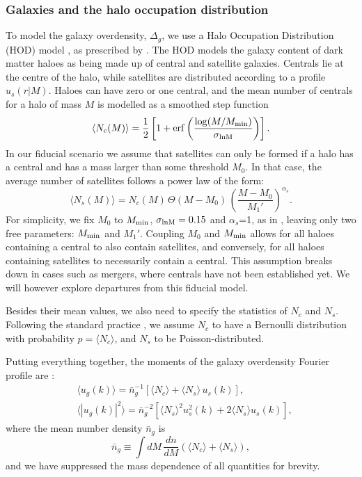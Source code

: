 \documentclass[useAMS,usenatbib]{mn2e}
\begin{document}
    \subsubsection{Galaxies and the halo occupation distribution}\label{sssec:theory.hm.hod}
      To model the galaxy overdensity, $\Delta_g$, we use a Halo Occupation Distribution (HOD) model \citep{2002ApJ...575..587B,2005ApJ...633..791Z,2013MNRAS.430..725V}, as prescribed by \cite{2011ApJ...736...59Z}. The HOD models the galaxy content of dark matter haloes as being made up of central and satellite galaxies. Centrals lie at the centre of the halo, while satellites are distributed according to a profile $u_s(r|M)$. Haloes can have zero or one central, and the mean number of centrals for a halo of mass $M$ is modelled as a smoothed step function
      \begin{equation}
        \langle N_c(M)\rangle=\frac{1}{2}\left[1+{\rm erf}\left(\frac{\log(M/M_{\rm min})}{\sigma_{\rm lnM}}\right)\right].
      \end{equation}
      In our fiducial scenario we assume that satellites can only be formed if a halo has a central and has a mass larger than some threshold $M_0$. In that case, the average number of satellites follows a power law of the form:
      \begin{equation}\label{eq:hod1}
        \langle N_s(M)\rangle=N_c(M)\,\Theta(M-M_0)\,\left(\frac{M-M_0}{M_1'}\right)^{\alpha_s}.
      \end{equation}
      For simplicity, we fix $M_0$ to $M_{\rm min}$, $\sigma_{\rm lnM}=0.15$ and $\alpha_s$=1, as in \cite{2018MNRAS.473.4318A}, leaving only two free parameters: $M_{\rm min}$ and $M_1'$. Coupling $M_0$ and $M_{\rm min}$ allows for all haloes containing a central to also contain satellites, and conversely, for all haloes containing satellites to necessarily contain a central. This assumption breaks down in cases such as mergers, where centrals have not been established yet. We will however explore departures from this fiducial model.
      
      Besides their mean values, we also need to specify the statistics of $N_c$ and $N_s$. Following the standard practice \citep{2013MNRAS.430..725V}, we assume $N_c$ to have a Bernoulli distribution with probability $p=\langle N_c\rangle$, and $N_s$ to be Poisson-distributed.

      Putting everything together, the moments of the galaxy overdensity Fourier profile are \citep[e.g. see section 2.2 of][]{2013MNRAS.430..725V}:
      \begin{align}
        &\langle u_g(k)\rangle=\bar{n}_g^{-1}\left[\langle N_c\rangle	+\langle N_s\rangle\,u_s(k)\right],\\
        &\langle |u_g(k)|^2\rangle=\bar{n}_g^{-2}\left[\langle N_s\rangle^2u_s^2(k)+2\langle N_s\rangle u_s(k)\right],
      \end{align}
      where the mean number density $\bar{n}_g$ is
      \begin{equation}
        \bar{n}_g\equiv\int dM\,\frac{dn}{dM}\left(\langle N_c\rangle+\langle N_s\rangle\right),
      \end{equation} 
      and we have suppressed the mass dependence of all quantities for brevity.
\end{document}
